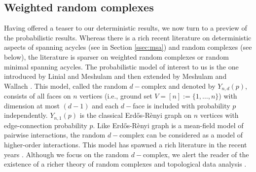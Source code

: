 \documentclass[12pt]{amsart}
\numberwithin{equation}{section}
\numberwithin{theorem}{section}
\newcommand{\1}{\mathbf{1}}
\begin{document}
\subsection{Weighted random complexes}
\label{ssec:rc}

Having offered a teaser to our deterministic results, we now turn to a preview of the probabilistic results. Whereas there is a rich recent literature on deterministic aspects of spanning acycles (see in Section \ref{ssec:msa}) and random complexes (see below), the literature is sparser on weighted random complexes or random minimal spanning acycles. The probabilistic model of interest to us is the one introduced by Linial and Meshulam \cite{linial2006homological} and then extended by Meshulam and Wallach \cite{meshulam2009homological}. This model, called the random $d-$complex and denoted by $Y_{n,d}(p)$, consists of all faces on $n$ vertices (i.e., ground set $V = [n] := \{1, \ldots, n\}$) with dimension at most $(d-1)$ and each $d-$face is included with probability $p$ independently. $Y_{n,1}(p)$ is the classical Erd\H{o}s-R\`enyi graph on $n$ vertices with edge-connection probability $p$. Like Erd\H{o}s-R\`enyi graph is a mean-field model of pairwise interactions, the random $d-$complex can be considered as a model of higher-order interactions. This model has spawned a rich literature in the recent years \cite{linial2006homological,meshulam2009homological,Costa12DCG,Costa12asphericity,Costa15,Linial14phase}.  Although we focus on the random $d-$complex, we alert the reader of the existence of a richer theory of random complexes and topological data analysis \cite{Carlsson14, kahle2014topology, bobrowski2014topology, Kahle16, Costa12}.
\end{document}
